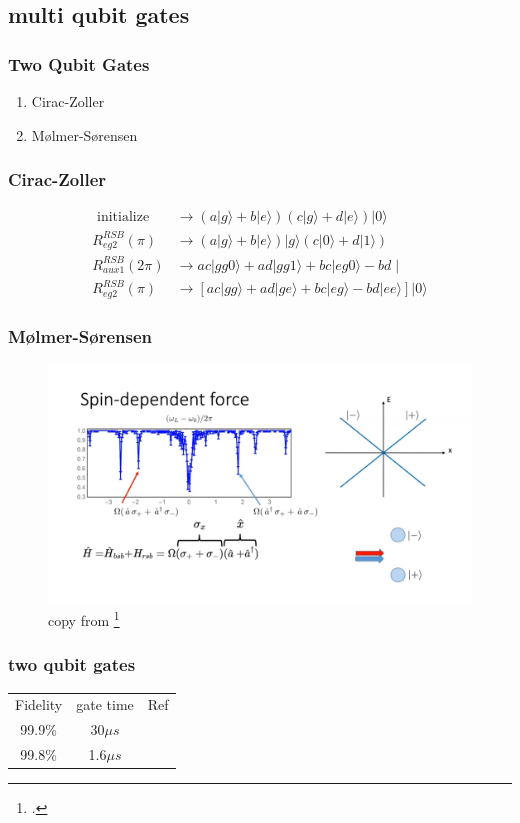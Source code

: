\documentclass[18 pt]{beamer}
\begin{document}
\subsection{multi qubit gates}
\begin{frame}
  \frametitle{Two Qubit Gates}
  \begin{enumerate}
    \item Cirac-Zoller
    \item Mølmer-Sørensen
  \end{enumerate}
\end{frame}
\begin{frame}
  \frametitle{Cirac-Zoller}
  \begin{align}
    \text { initialize } & \rightarrow(a|g\rangle+b|e\rangle)(c|g\rangle+d|e\rangle)|0\rangle \\
    R_{e g 2}^{R S B}(\pi) & \rightarrow(a|g\rangle+b|e\rangle)|g\rangle(c|0\rangle+d|1\rangle) \\
    R_{a u x 1}^{R S B}(2 \pi) & \rightarrow a c|g g 0\rangle+a d|g g 1\rangle+b c|e g 0\rangle-b d \mid \\
    R_{e g 2}^{R S B}(\pi) & \rightarrow \left[a c|g g\rangle+a d|g e\rangle+b c|e g\rangle-b d|e e\rangle\right]|0\rangle
    \end{align}
\end{frame}
\begin{frame}
  \frametitle{Mølmer-Sørensen}
  \begin{figure}
    \includegraphics[width=.8\textwidth]{M.png}
    \caption{copy from \footcite{https://www.youtube.com/watch?v=uNTNsfxoKYQ&t=2026s}}
  \end{figure}
\end{frame}
\begin{frame}
  \frametitle{two qubit gates}
  \begin{table}[]
    \begin{tabular}{ccc}
    Fidelity & gate time & Ref \\
    99.9\% & 30\(\mu s\) & \url[a]{https://arxiv.org/abs/1604.00032}\\
    99.8\% &1.6\(\mu s\) & \url[b]{https://arxiv.org/abs/1709.06952}
    \end{tabular}
  \end{table}
\end{frame}
\end{document}
